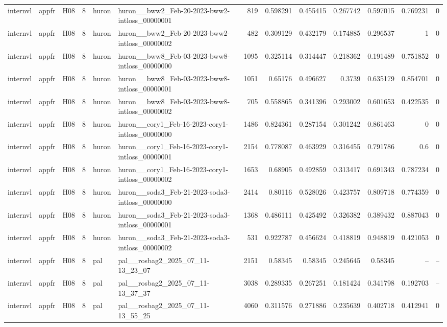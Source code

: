 \begin{longtable}{lllrllrrrrrrr}
internvl & appfr & H08 & 8 & huron & huron\_\_bww2\_Feb-20-2023-bww2-intloss\_00000001 & 819 & 0.598291 & 0.455415 & 0.267742 & 0.597015 & 0.769231 & 0 \\
internvl & appfr & H08 & 8 & huron & huron\_\_bww2\_Feb-20-2023-bww2-intloss\_00000002 & 482 & 0.309129 & 0.432179 & 0.174885 & 0.296537 & 1 & 0 \\
internvl & appfr & H08 & 8 & huron & huron\_\_bww8\_Feb-03-2023-bww8-intloss\_00000000 & 1095 & 0.325114 & 0.314447 & 0.218362 & 0.191489 & 0.751852 & 0 \\
internvl & appfr & H08 & 8 & huron & huron\_\_bww8\_Feb-03-2023-bww8-intloss\_00000001 & 1051 & 0.65176 & 0.496627 & 0.3739 & 0.635179 & 0.854701 & 0 \\
internvl & appfr & H08 & 8 & huron & huron\_\_bww8\_Feb-03-2023-bww8-intloss\_00000002 & 705 & 0.558865 & 0.341396 & 0.293002 & 0.601653 & 0.422535 & 0 \\
internvl & appfr & H08 & 8 & huron & huron\_\_cory1\_Feb-16-2023-cory1-intloss\_00000000 & 1486 & 0.824361 & 0.287154 & 0.301242 & 0.861463 & 0 & 0 \\
internvl & appfr & H08 & 8 & huron & huron\_\_cory1\_Feb-16-2023-cory1-intloss\_00000001 & 2154 & 0.778087 & 0.463929 & 0.316455 & 0.791786 & 0.6 & 0 \\
internvl & appfr & H08 & 8 & huron & huron\_\_cory1\_Feb-16-2023-cory1-intloss\_00000002 & 1653 & 0.68905 & 0.492859 & 0.313417 & 0.691343 & 0.787234 & 0 \\
internvl & appfr & H08 & 8 & huron & huron\_\_soda3\_Feb-21-2023-soda3-intloss\_00000000 & 2414 & 0.80116 & 0.528026 & 0.423757 & 0.809718 & 0.774359 & 0 \\
internvl & appfr & H08 & 8 & huron & huron\_\_soda3\_Feb-21-2023-soda3-intloss\_00000001 & 1368 & 0.486111 & 0.425492 & 0.326382 & 0.389432 & 0.887043 & 0 \\
internvl & appfr & H08 & 8 & huron & huron\_\_soda3\_Feb-21-2023-soda3-intloss\_00000002 & 531 & 0.922787 & 0.456624 & 0.418819 & 0.948819 & 0.421053 & 0 \\
internvl & appfr & H08 & 8 & pal & pal\_\_rosbag2\_2025\_07\_11-13\_23\_07 & 2151 & 0.58345 & 0.58345 & 0.245645 & 0.58345 & -- & -- \\
internvl & appfr & H08 & 8 & pal & pal\_\_rosbag2\_2025\_07\_11-13\_37\_37 & 3038 & 0.289335 & 0.267251 & 0.181424 & 0.341798 & 0.192703 & -- \\
internvl & appfr & H08 & 8 & pal & pal\_\_rosbag2\_2025\_07\_11-13\_55\_25 & 4060 & 0.311576 & 0.271886 & 0.235639 & 0.402718 & 0.412941 & 0 \\

\end{longtable}
